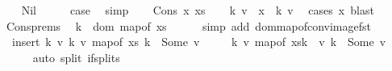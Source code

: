 \begin{isabellebody}
\ \ \isamarkupfalse%
\ Nil\isanewline
\ \ \isamarkupfalse%
\ \isamarkupfalse%
\ {\isacharquery}{\kern0pt}case\ \isamarkupfalse%
\ simp\isanewline
{}\isamarkupfalse%
\isanewline
\ \ \isamarkupfalse%
\ {\isacharparenleft}{\kern0pt}Cons\ x\ xs{\isacharparenright}{\kern0pt}\isanewline
\ \ \isamarkupfalse%
\ k\ v\ \ {\isachardoublequoteopen}x\ {\isacharequal}{\kern0pt}\ {\isacharparenleft}{\kern0pt}k{\isacharcomma}{\kern0pt}\ v{\isacharparenright}{\kern0pt}{\isachardoublequoteclose}\ \isamarkupfalse%
\ {\isacharparenleft}{\kern0pt}cases\ x{\isacharparenright}{\kern0pt}\ blast\isanewline
\ \ \isamarkupfalse%
\ Cons{\isachardot}{\kern0pt}prems\ \isamarkupfalse%
\ {\isachardoublequoteopen}k\ {\isasymnotin}\ dom\ {\isacharparenleft}{\kern0pt}map{\isacharunderscore}{\kern0pt}of\ xs{\isacharparenright}{\kern0pt}{\isachardoublequoteclose}\isanewline
\ \ \ \ \isamarkupfalse%
\ {\isacharparenleft}{\kern0pt}simp\ add{\isacharcolon}{\kern0pt}\ dom{\isacharunderscore}{\kern0pt}map{\isacharunderscore}{\kern0pt}of{\isacharunderscore}{\kern0pt}conv{\isacharunderscore}{\kern0pt}image{\isacharunderscore}{\kern0pt}fst{\isacharparenright}{\kern0pt}\isanewline
\ \ \isamarkupfalse%
\ \isamarkupfalse%
\ {\isacharasterisk}{\kern0pt}{\isacharcolon}{\kern0pt}\ {\isachardoublequoteopen}insert\ {\isacharparenleft}{\kern0pt}k{\isacharcomma}{\kern0pt}\ v{\isacharparenright}{\kern0pt}\ {\isacharbraceleft}{\kern0pt}{\isacharparenleft}{\kern0pt}k{\isacharcomma}{\kern0pt}\ v{\isacharparenright}{\kern0pt}{\isachardot}{\kern0pt}\ map{\isacharunderscore}{\kern0pt}of\ xs\ k\ {\isacharequal}{\kern0pt}\ Some\ v{\isacharbraceright}{\kern0pt}\ {\isacharequal}{\kern0pt}\isanewline
\ \ \ \ {\isacharbraceleft}{\kern0pt}{\isacharparenleft}{\kern0pt}k{\isacharprime}{\kern0pt}{\isacharcomma}{\kern0pt}\ v{\isacharprime}{\kern0pt}{\isacharparenright}{\kern0pt}{\isachardot}{\kern0pt}\ {\isacharparenleft}{\kern0pt}map{\isacharunderscore}{\kern0pt}of\ xs{\isacharparenleft}{\kern0pt}k\ {\isasymmapsto}\ v{\isacharparenright}{\kern0pt}{\isacharparenright}{\kern0pt}\ k{\isacharprime}{\kern0pt}\ {\isacharequal}{\kern0pt}\ Some\ v{\isacharprime}{\kern0pt}{\isacharbraceright}{\kern0pt}{\isachardoublequoteclose}\isanewline
\ \ \ \ \isamarkupfalse%
\ {\isacharparenleft}{\kern0pt}auto\ split{\isacharcolon}{\kern0pt}\ if{\isacharunderscore}{\kern0pt}splits{\isacharparenright}{\kern0pt}\isanewline

\end{isabellebody}
